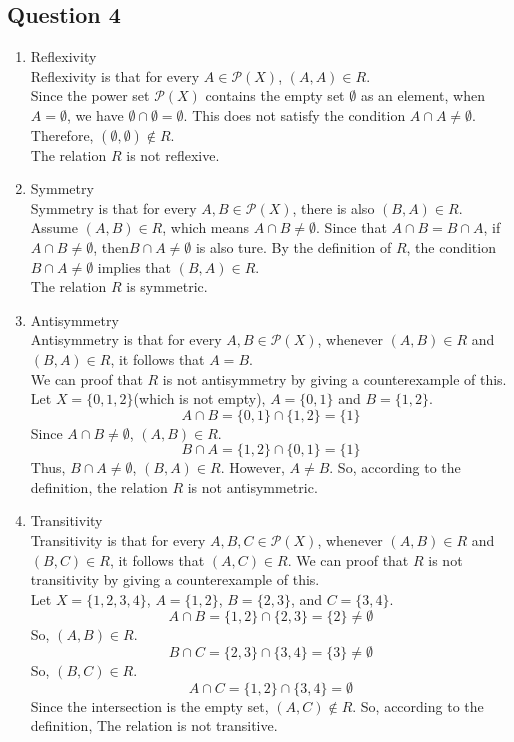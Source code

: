 \documentclass[12pt,a4paper]{article}
\begin{document}
\subsection*{Question 4}
\begin{enumerate}
\item Reflexivity\\
Reflexivity is that for every $A \in \mathcal{P}(X)$,  $(A, A) \in R$.\\
Since the power set $\mathcal{P}(X)$ contains the empty set $\emptyset$ as an element, when $A = \emptyset$, we have $\emptyset \cap \emptyset = \emptyset$. This does not satisfy the condition $A \cap A \neq \emptyset$.\\
Therefore, $(\emptyset, \emptyset) \notin R$.\\
The relation $R$ is not reflexive.

\item Symmetry\\
Symmetry is that for every $A, B \in \mathcal{P}(X)$,  there is also $(B, A) \in R$.\\
 Assume $(A, B) \in R$, which means $A \cap B \neq \emptyset$.
 Since that $A \cap B = B \cap A$, if $A \cap B \neq \emptyset$, then$B \cap A \neq \emptyset$ is also ture. By the definition of $R$, the condition $B \cap A \neq \emptyset$ implies that $(B, A) \in R$.
\\The relation $R$ is symmetric.

\item Antisymmetry\\
Antisymmetry is that for every $A, B \in \mathcal{P}(X)$, whenever $(A, B) \in R$ and $(B, A) \in R$, it follows that $A = B$.\\
We can proof that $R$ is not antisymmetry by giving a counterexample of this.\\
Let $X = \{0,1, 2\}$(which is not empty), $A = \{0,1\}$ and $B = \{1, 2\}$.\\
    \[ A \cap B =   \{0,1\}\cap\{1, 2\} = \{1\} \]
Since $A \cap B \neq \emptyset$,  $(A, B) \in R$.
    \[ B \cap A =\{1, 2\}  \cap\{0, 1\}  = \{1\} \]
Thus, $B \cap A \neq \emptyset$,  $(B, A) \in R$.
However, $A \neq B$.
So, according to the definition, the relation $R$ is not antisymmetric.

\item Transitivity\\
Transitivity is that for every $A, B, C \in \mathcal{P}(X)$, whenever $(A, B) \in R$ and $(B, C) \in R$, it follows that $(A, C) \in R$.
We can proof that $R$ is not transitivity by giving a counterexample of this.\\
Let $X = \{1, 2, 3, 4\}$, $A = \{1, 2\}$, $B = \{2, 3\}$, and $C = \{3, 4\}$.
    \[ A \cap B = \{1, 2\} \cap \{2, 3\} = \{2\} \neq \emptyset \]
   So, $(A, B) \in R$.
    \[ B \cap C = \{2, 3\} \cap \{3, 4\} = \{3\} \neq \emptyset \]
    So, $(B, C) \in R$.
    \[ A \cap C = \{1, 2\} \cap \{3, 4\} = \emptyset \]
Since the intersection is the empty set, $(A, C) \notin R$.
So, according to the definition, The relation is not transitive.
\end{enumerate}
\end{document}
